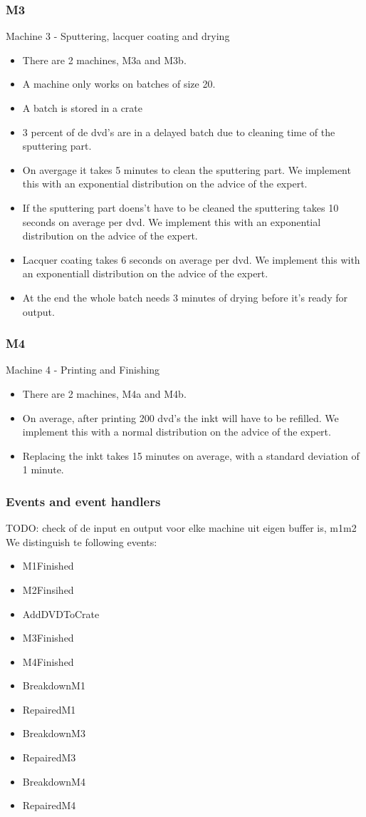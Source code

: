 \documentclass[11pt,a4paper]{article}
\begin{document}
\subsubsection{M3}
Machine 3 - Sputtering, lacquer coating and drying
\begin{itemize}
\item There are 2 machines, M3a and M3b. 
\item  A machine only works on batches of size 20.
\item A batch is stored in a crate
\item  3 percent of de dvd's are in a delayed batch due to cleaning time of the sputtering part. 
\item  On avergage it takes 5 minutes to clean the sputtering part.  We implement this with an exponential distribution on the advice of the expert. 
\item If the sputtering part doens't have to be cleaned the sputtering takes 10 seconds on average per dvd. We implement this with an exponential distribution on the advice of the expert. 
\item Lacquer coating takes 6 seconds on average per dvd. We implement this with an exponentiall distribution on the advice of the expert. 
\item At the end the whole batch needs 3 minutes of drying before it's ready for output. 
\end{itemize}

\subsubsection{M4}
Machine 4 - Printing and Finishing
\begin{itemize}
\item  There are 2 machines, M4a and M4b. 
\item On average, after printing 200 dvd's the inkt will have to be refilled. We implement this with a normal distribution on the advice of the expert. 
\item Replacing the inkt takes 15 minutes on average, with a standard deviation of 1 minute.
\end{itemize}

\subsubsection{Events and event handlers}
TODO: check of de input en output voor elke machine uit eigen buffer is, m1m2
We distinguish te following events:
\begin{itemize}
\item M1Finished
\item M2Finsihed
\item AddDVDToCrate
\item M3Finished
\item M4Finished
\item BreakdownM1
\item RepairedM1
\item BreakdownM3
\item RepairedM3
\item BreakdownM4
\item RepairedM4
\end{itemize}
\end{document}
